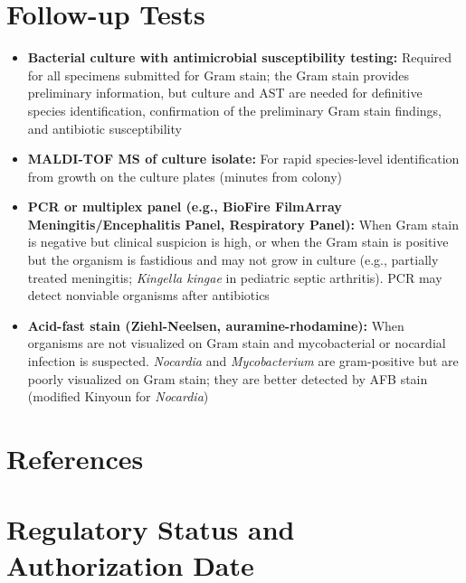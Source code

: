 \section*{Follow-up Tests}
\begin{itemize}
  \item \textbf{Bacterial culture with antimicrobial susceptibility testing:} Required for all specimens submitted for Gram stain; the Gram stain provides preliminary information, but culture and AST are needed for definitive species identification, confirmation of the preliminary Gram stain findings, and antibiotic susceptibility
  \item \textbf{MALDI-TOF MS of culture isolate:} For rapid species-level identification from growth on the culture plates (minutes from colony)
  \item \textbf{PCR or multiplex panel (e.g., BioFire FilmArray Meningitis/Encephalitis Panel, Respiratory Panel):} When Gram stain is negative but clinical suspicion is high, or when the Gram stain is positive but the organism is fastidious and may not grow in culture (e.g., partially treated meningitis; \textit{Kingella kingae} in pediatric septic arthritis). PCR may detect nonviable organisms after antibiotics
  \item \textbf{Acid-fast stain (Ziehl-Neelsen, auramine-rhodamine):} When organisms are not visualized on Gram stain and mycobacterial or nocardial infection is suspected. \textit{Nocardia} and \textit{Mycobacterium} are gram-positive but are poorly visualized on Gram stain; they are better detected by AFB stain (modified Kinyoun for \textit{Nocardia})
\end{itemize}

\section*{References}



\clearpage
\section*{Regulatory Status and Authorization Date}

\clearpage

